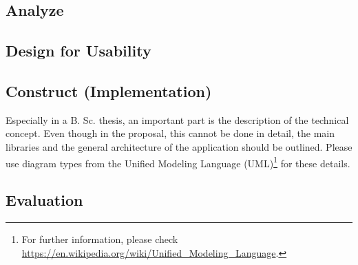 \subsection{Analyze}
\label{subsec:analyze}

\subsection{Design for Usability}
\label{subsec:design}

\subsection{Construct (Implementation)}
\label{subsec:implementation}

Especially in a B. Sc. thesis, an important part is the description of the technical concept. Even though in the proposal, this cannot be done in detail, the main libraries and the general architecture of the application should be outlined. Please use diagram types from the Unified Modeling Language (UML)\footnote{For further information, please check \url{https://en.wikipedia.org/wiki/Unified_Modeling_Language}.} for these details.

\subsection{Evaluation}
\label{subsec:evaluation}